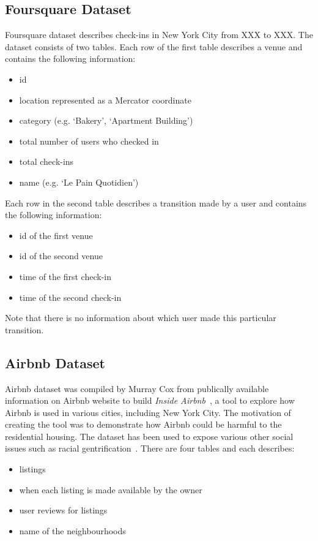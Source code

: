 \subsection{Foursquare Dataset}
Foursquare dataset describes check-ins in New York City from \color{red} XXX to XXX.\color{black} 
The dataset consists of two tables.
Each row of the first table describes a venue and contains the following information:
\begin{itemize}
\item id
\item location represented as a Mercator coordinate
\item category (e.g. `Bakery', `Apartment Building')
\item total number of users who checked in
\item total check-ins
\item name (e.g. `Le Pain Quotidien')
\end{itemize}
Each row in the second table describes a transition made by a user and contains the following information:
\begin{itemize}
\item id of the first venue 
\item id of the second venue
\item time of the first check-in
\item time of the second check-in
\end{itemize}
Note that there is no information about which user made this particular transition.
\subsection{Airbnb Dataset}
Airbnb dataset was compiled by Murray Cox from publically available information on Airbnb website to build \emph{Inside Airbnb}~\citep{insideairbnb}, a tool to explore how Airbnb is used in various cities, including New York City.
The motivation of creating the tool was to demonstrate how Airbnb could be harmful to the residential housing.
The dataset has been used to expose various other social issues such as racial gentrification~\citep{gentrification}.
There are four tables and each describes:
\begin{itemize}
\item listings
\item when each listing is made available by the owner
\item user reviews for listings
\item name of the neighbourhoods
\end{itemize}